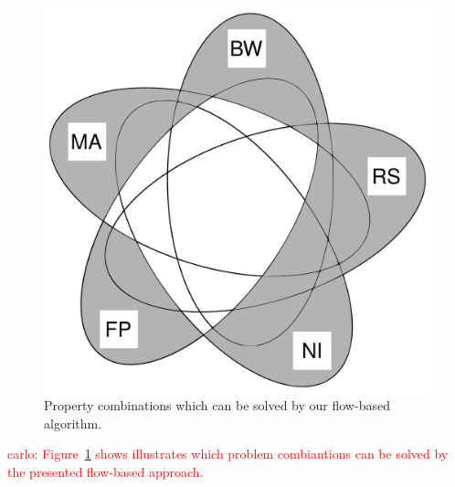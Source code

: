\documentclass[9pt,twocolumn]{scrartcl}
\newcommand{\carlo}[1]{\textcolor{red}{carlo: #1}}
\begin{document}
\begin{figure}
\includegraphics[width=\columnwidth]{figs/venn_flow.pdf}
\caption{Property combinations which can be solved by our flow-based algorithm.}
\label{fig:venn_flow}
\end{figure}

\carlo{Figure~\ref{fig:venn_flow} shows illustrates which problem
combiantions can be solved by the presented flow-based approach.}
\end{document}
